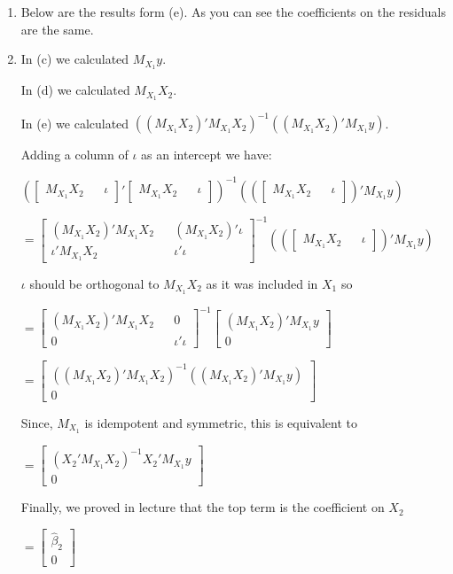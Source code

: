 \documentclass{article}
\begin{document}
\begin{enumerate}[label=\alph*)]
\item

Below are the results form (e). As you can see the coefficients on the residuals are the same.



\item

In (c) we calculated $M_{X_1}y$. 

In (d) we calculated $M_{X_1}X_2$.

In (e) we calculated $((M_{X_1}X_2)'M_{X_1}X_2)^{-1}((M_{X_1}X_2)'M_{X_1}y)$.

Adding a column of $\iota$ as an intercept we have:

$(\begin{bmatrix} M_{X_1}X_2 && \iota \end{bmatrix}'\begin{bmatrix} M_{X_1}X_2 && \iota \end{bmatrix})^{-1}((\begin{bmatrix} M_{X_1}X_2 && \iota \end{bmatrix})'M_{X_1}y)$

$= \begin{bmatrix} (M_{X_1}X_2)'M_{X_1}X_2 && (M_{X_1}X_2)'\iota \\ \iota'M_{X_1}X_2 && \iota'\iota\end{bmatrix}^{-1}((\begin{bmatrix} M_{X_1}X_2 && \iota \end{bmatrix})'M_{X_1}y)$

$\iota$ should be orthogonal to $M_{X_1}X_2$ as it was included in $X_1$ so

$= \begin{bmatrix} (M_{X_1}X_2)'M_{X_1}X_2 && 0 \\ 0 && \iota'\iota \end{bmatrix}^{-1}\begin{bmatrix} (M_{X_1}X_2)'M_{X_1}y \\ 0 \end{bmatrix}$

$= \begin{bmatrix} ((M_{X_1}X_2)'M_{X_1}X_2)^{-1}((M_{X_1}X_2)'M_{X_1}y) \\ 0 \end{bmatrix}$

Since, $M_{X_1}$ is idempotent and symmetric, this is equivalent to

$= \begin{bmatrix} (X_2' M_{X_1}X_2)^{-1}X_2' M_{X_1}y \\ 0 \end{bmatrix}$

Finally, we proved in lecture that the top term is the coefficient on $X_2$

$= \begin{bmatrix} \hat{\beta}_2 \\ 0 \end{bmatrix}$


\end{enumerate}
\end{document}
